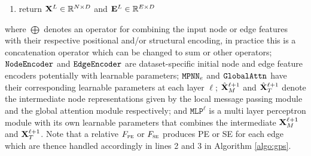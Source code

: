 \documentclass{article}
\begin{document}
\begin{algorithm}
\begin{enumerate}
\begin{enumerate}
        \item $\X^{\ell+1}_M   \gets \bn \left( \drp \left( \hat\X^{\ell+1}_M \right) + \X^{\ell} \right)$
        \item $\X^{\ell+1}_T   \gets \bn \left( \drp \left( \hat\X^{\ell+1}_T \right) + \X^{\ell} \right)$
        \item $\X^{\ell+1}     \gets \texttt{MLP}^{\ell}\left(\X^{\ell+1}_M + \X^{\ell+1}_T\right)$
    \end{enumerate}
    \item return $\mathbf{X}^{L} \in \mathbb{R}^{N \times D}$ and $\mathbf{E}^{L} \in \mathbb{R}^{E \times D}$
\end{enumerate}
\label{algo:gps}
\end{algorithm}
where $\bigoplus$ denotes an operator for combining the input node or edge features with their respective positional and/or structural encoding, in practice this is a concatenation operator which can be changed to sum or other operators; $\texttt{NodeEncoder}$ and $\texttt{EdgeEncoder}$ are dataset-specific initial node and edge feature encoders potentially with learnable parameters; $\texttt{MPNN}_e$ and $\texttt{GlobalAttn}$ have their corresponding learnable parameters at each layer $\ell$; $\hat{\mathbf{X}}^{\ell+1}_M$ and $\hat{\mathbf{X}}^{\ell+1}_T$ denote the intermediate node representations given by the local message passing module and the global attention module respectively; and $\texttt{MLP}^{\ell}$ is a multi layer perceptron module with its own learnable parameters that combines the intermediate $\mathbf{X}^{\ell+1}_M$ and $\mathbf{X}^{\ell+1}_T$. Note that a relative $F_\textsc{pe}$ or $F_\textsc{se}$ produces PE or SE for each edge which are thence handled accordingly in lines 2 and 3 in Algorithm \ref{algo:gps}.




\end{document}
